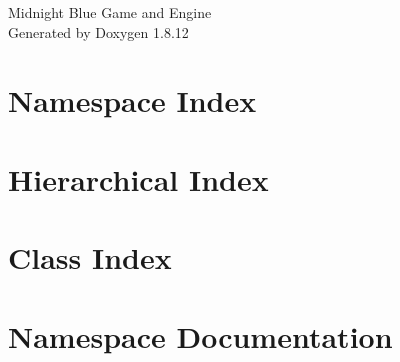 \documentclass[twoside]{book}
\newcommand{\+}{\discretionary{\mbox{\scriptsize$\hookleftarrow$}}{}{}}
\newcommand{\clearemptydoublepage}{%
  \newpage{\pagestyle{empty}\cleardoublepage}%
}
\begin{document}
\hypersetup{pageanchor=false,
             bookmarksnumbered=true,
             pdfencoding=unicode
            }
\begin{titlepage}
\vspace*{7cm}
\begin{center}%
{\Large Midnight Blue Game and Engine }\\
\vspace*{1cm}
{\large Generated by Doxygen 1.8.12}\\
\end{center}
\end{titlepage}
\clearemptydoublepage
{}
\tableofcontents
\clearemptydoublepage
{}
\hypersetup{pageanchor=true}

\chapter{Namespace Index}

\chapter{Hierarchical Index}

\chapter{Class Index}

\chapter{Namespace Documentation}











\end{document}
